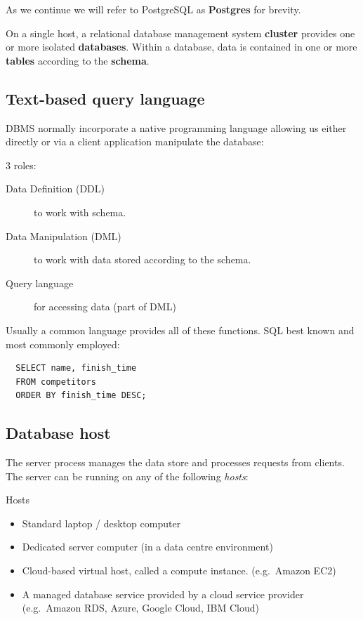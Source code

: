\documentclass[slides]{pgnotes}
\begin{document}
As we continue we will refer to PostgreSQL as \textbf{Postgres} for brevity.

On a single host, a relational database management system \textbf{cluster} provides one or more isolated \textbf{databases}.
Within a database, data is contained in one or more \textbf{tables} according to the \textbf{schema}.


\subsection{Text-based query language}

DBMS normally incorporate a native programming language allowing us either directly or via a client application manipulate the database: 

\begin{greenbox}{3 roles:}
\begin{description}
\item[Data Definition (DDL)] to work with schema.
\item[Data Manipulation (DML)] to work with data stored according to the schema.
\item[Query language] for accessing data (part of DML)
\end{description}
\end{greenbox}

Usually a common language provides all of these functions.
SQL best known and most commonly employed:

\begin{verbatim}
  SELECT name, finish_time
  FROM competitors
  ORDER BY finish_time DESC;
\end{verbatim}

\subsection{Database host}

The server process manages the data store and processes requests from clients.
The server can be running on any of the following \emph{hosts}:

\begin{greenbox}{Hosts}
  \begin{itemize}
  \item
    Standard laptop / desktop computer
  \item
    Dedicated server computer (in a data centre environment)
  \item
    Cloud-based virtual host, called a compute instance. (e.g.~Amazon EC2)
  \item
    A managed database service provided by a cloud service provider
    (e.g.~Amazon RDS, Azure, Google Cloud, IBM Cloud)
  \end{itemize}
\end{greenbox}
\end{document}
